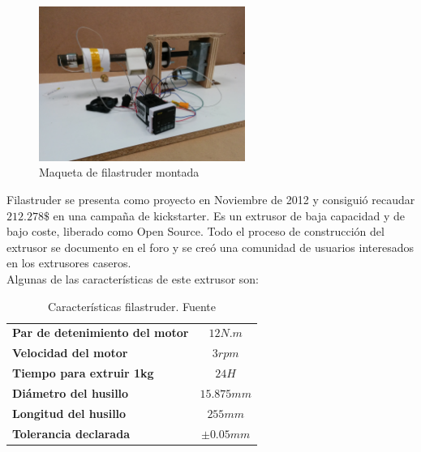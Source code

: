 	\begin{figure}[H]
            \centering
            \includegraphics[width=0.6\textwidth]{images/filaextruder/IMG_20150313_111634.jpg}
            \caption{Maqueta de filastruder montada}
            \label{fig:hardware_filastruder}
    \end{figure}

Filastruder se presenta como proyecto en Noviembre de 2012 \cite{filastruder} y consiguió recaudar $212.278 \$$ en una campaña de kickstarter. Es un extrusor de baja capacidad y de bajo coste, liberado como Open Source. Todo el proceso de construcción del extrusor se documento en el foro y se creó una comunidad de usuarios interesados en los extrusores caseros.\\

Algunas de las características de este extrusor son:

\begin{table}[H]
\centering

\begin{tabular}{lc}
\textbf{Par de detenimiento del motor}            & $12N.m$                           \\
\textbf{Velocidad del motor}                      & $3 rpm$                           \\
\textbf{Tiempo para extruir 1kg}                  & $24H$                             \\
\textbf{Diámetro del husillo}                     & $15.875mm$                        \\
\textbf{Longitud del husillo}					  & $255mm$           				  \\
\textbf{Tolerancia declarada}					  & $\pm 0.05 mm$					  \\	

\end{tabular}
\caption{Características filastruder. Fuente\cite{tfg_diego}}
\label{tab:caract_filas}
\end{table}

